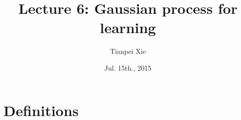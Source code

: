 \documentclass[11pt]{article}
\begin{document}
\title{Lecture 6: Gaussian process for learning}
\author{ Tianpei Xie}
\date{ Jul. 15th., 2015 }
\maketitle
\tableofcontents
\newpage
\section{Definitions}
%
%
%
\end{document}
